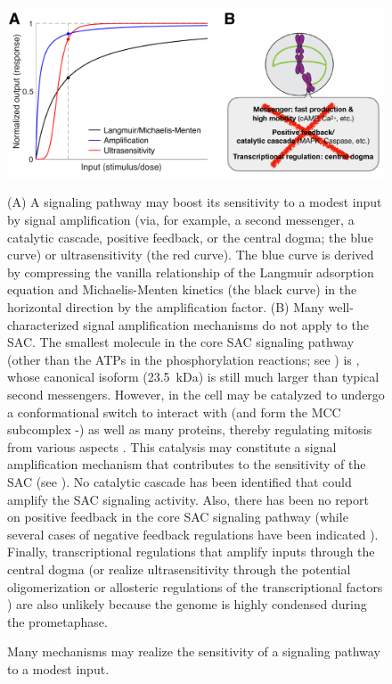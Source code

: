 \begin{figure}
    \centering
    \includegraphics[width=\textwidth]{chapters/figures/SensitivityMechanisms.pdf}
    \caption{Many mechanisms may realize the sensitivity of a signaling pathway to a modest input.}
    \noindent\justifying 
    (A) A signaling pathway may boost its sensitivity to a modest input by signal amplification (via, for example, a second messenger, a catalytic cascade, positive feedback, or the central dogma; the blue curve) or ultrasensitivity (the red curve). The blue curve is derived by compressing the vanilla relationship of the Langmuir adsorption equation and Michaelis-Menten kinetics (the black curve) in the horizontal direction by the amplification factor. (B) Many well-characterized signal amplification mechanisms do not apply to the SAC. The smallest molecule in the core SAC signaling pathway (other than the ATPs in the phosphorylation reactions; see ) is , whose canonical isoform (\SI{23.5}{kDa}) is still much larger than typical second messengers. However,  in the cell may be catalyzed to undergo a conformational switch to interact with  (and form the MCC subcomplex -) as well as many proteins, thereby regulating mitosis from various aspects \cite{Separase-SGO2-MAD2, KIF20A-MAD2, CyclinB2-MAD2}. This catalysis may constitute a signal amplification mechanism that contributes to the sensitivity of the SAC (see ). No catalytic cascade has been identified that could amplify the SAC signaling activity. Also, there has been no report on positive feedback in the core SAC signaling pathway (while several cases of negative feedback regulations have been indicated \cite{Mps1pAutophosphorylation, PP2ADephosphorylatesBUB1, PP2ADephosphorylatesKNL1, PP2A-B56}). Finally, transcriptional regulations that amplify inputs through the central dogma (or realize ultrasensitivity through the potential oligomerization or allosteric regulations of the transcriptional factors \cite{TFMultimerization, TFAllostericRegulation}) are also unlikely because the genome is highly condensed during the prometaphase.
    \label{SensitivityMechanisms}
\end{figure}

